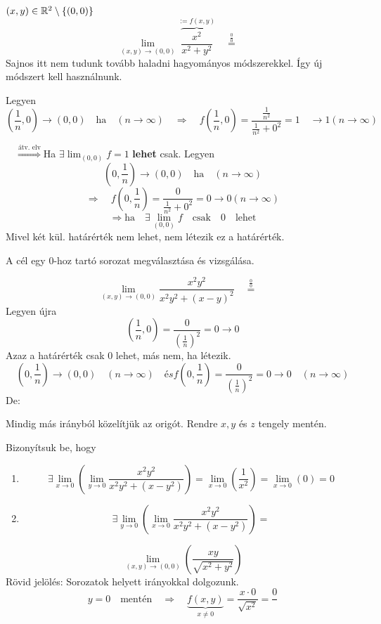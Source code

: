 \documentclass[a4paper,11.5pt]{article}
\begin{document}
	\begin{task}$(x,y)\in\mathbb{R}^2\setminus\{(0,0)\}$
		\[ \lim_{(x,y)\to(0,0)}\overbrace{\frac{x^2}{x^2+y^2}}^{:=f(x,y)}\quad \overset{\frac{0}{0}}{=}\quad  \]
		Sajnos itt nem tudunk tovább haladni hagyományos módszerekkel. Így új módszert kell használnunk.
		\smallskip
		
		Legyen \[\left(\frac{1}{n},0\right)\to(0,0)\quad \text{ha}\quad (n\to\infty)\quad \Rightarrow\quad f\left(\frac{1}{n},0\right)=\frac{\frac{1}{n^2}}{\frac{1}{n^2}+0^2}=1\quad \to1(n\to\infty)\]
		
		$\quad \overset{\text{átv. elv}}{\Rightarrow}$\quad Ha $\exists\lim_{(0,0)}f=1$ \textbf{lehet} csak.
		Legyen 
		\[ \left(0,\frac{1}{n}\right)\to(0,0)\quad \text{ha}\quad (n\to\infty) \]
		\[ \Rightarrow\quad f\left(0,\frac{1}{n}\right)=\frac{0}{\frac{1}{n^2}+0^2}=0\to 0(n\to\infty) \]
		\[ \Rightarrow \text{ha}\quad \exists\lim_{(0,0)}f\quad \text{csak}\quad 0 \quad \text{lehet} \]
		Mivel két kül. határérték nem lehet, nem létezik ez a határérték.
	\end{task}
	\begin{note}
		A cél egy 0-hoz tartó sorozat megválasztása és vizsgálása.
	\end{note}
	\begin{task}
		\[ \lim_{(x,y)\to(0,0)}\frac{x^2y^2}{x^2y^2+(x-y)^2}\quad \overset{\frac{0}{0}}{=}\quad  \]
		Legyen újra
		\[ \left(\frac{1}{n},0\right)=\frac{0}{\left(\frac{1}{n}\right)^2}=0\to0 \]
		Azaz a határérték csak 0 lehet, más nem, ha létezik.
		\[ \left(0,\frac{1}{n}\right)\to(0,0)\quad (n\to\infty)\quad és f\left(0,\frac{1}{n}\right)=\frac{0}{\left(\frac{1}{n}\right)^2}=0\to 0\quad (n\to\infty) \]
		De:
	\end{task}
	\begin{note}
		Mindig más irányból közelítjük az origót. Rendre $x, y$ és $z$ tengely mentén.
	\end{note}
	\begin{task}
		Bizonyítsuk be, hogy
		\begin{enumerate}
			\item \[ \exists\lim_{x\to0}\left(\lim_{y\to0}\frac{x^2y^2}{x^2y^2+(x-y^2)}\right)=\lim_{x\to0}\left(\frac{1}{x^2}\right)=\lim_{x\to0}(0)=0 \]
			\item \[ \exists\lim_{y\to0}\left(\lim_{x\to0}\frac{x^2y^2}{x^2y^2+(x-y^2)}\right)= \]
		\end{enumerate}
	\end{task}
	\begin{task}
		\[ \lim_{(x,y)\to(0,0)}\left(\frac{xy}{\sqrt{x^2+y^2}}\right) \]
		Rövid jelölés: Sorozatok helyett irányokkal dolgozunk.
		\[ y=0\quad \text{mentén}\quad \Rightarrow\quad \underbrace{f(x,y)}_{x\not=0}=\frac{x\cdot0}{\sqrt{x^2}}=\frac{0}{} \]
	\end{task}
\end{document}
